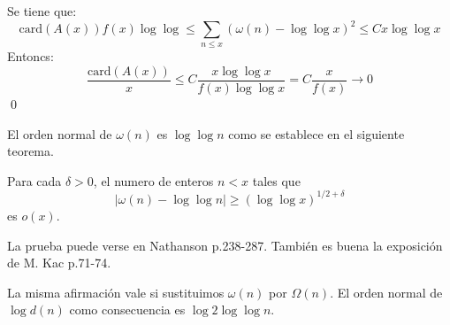 \documentclass[TAN.tex]{subfiles}
\begin{document}
\begin{dem}
Se tiene que:
\[ \text{card}(A(x))f(x)\log \log  ≤ \sum_{n≤x} (ω(n) - \log \log x)^2 ≤ Cx \log \log x \]
Entoncs:
\[ \frac{\text{card}(A(x))}{x} ≤ C \frac{x \log \log x}{f(x) \log \log x} = C \frac{x}{f(x)} \to 0\]
\qed
\end{dem}
El orden normal de $ω(n)$ es $\log \log n$ como se establece en el siguiente teorema.
\begin{teorema}
Para cada $δ > 0$, el numero de enteros $n < x$ tales que
\[ |ω(n) - \log \log n| ≥ (\log \log x)^{1/2+δ} \]
es $ο(x)$.
\end{teorema}
La prueba puede verse en Nathanson p.238-287. También es buena la exposición de M. Kac p.71-74.

La misma afirmación vale si sustituimos $ω(n)$ por $Ω(n)$. El orden normal de $\log d(n)$ como consecuencia es $\log 2 \log \log n$.
\end{document}
